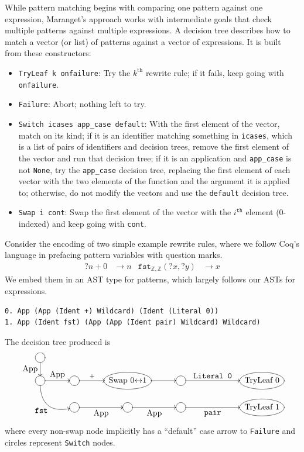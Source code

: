 While pattern matching begins with comparing one pattern against one expression, Maranget's approach works with intermediate goals that check multiple patterns against multiple expressions.
A decision tree describes how to match a vector (or list) of patterns against a vector of expressions.
It is built from these constructors:
\begin{itemize}
  \item \texttt{TryLeaf k onfailure}: Try the $k^\text{th}$ rewrite rule; if it fails, keep going with \texttt{onfailure}.
  \item \texttt{Failure}: Abort; nothing left to try.
  \item \texttt{Switch icases app\_case default}:
    With the first element of the vector, match on its kind; if it is an identifier matching something in \texttt{icases}, which is a list of pairs of identifiers and decision trees, remove the first element of the vector and run that decision tree; if it is an application and \texttt{app\_case} is not \texttt{None}, try the \texttt{app\_case} decision tree, replacing the first element of each vector with the two elements of the function and the argument it is applied to; otherwise, do not modify the vectors and use the \texttt{default} decision tree.
  \item \texttt{Swap i cont}: Swap the first element of the vector with the $i^\texttt{th}$ element (0-indexed) and keep going with \texttt{cont}.
\end{itemize}

Consider the encoding of two simple example rewrite rules, where we follow Coq's \Ltac{} language in prefacing pattern variables with question marks.
\begin{align*}
  ?n + 0 & \to n %
  &
  \texttt{fst}_{\mathbb{Z},\mathbb{Z}}(?x, ?y) & \to x
\end{align*}
We embed them in an AST type for patterns, which largely follows our ASTs for expressions.
\begin{verbatim}
0. App (App (Ident +) Wildcard) (Ident (Literal 0))
1. App (Ident fst) (App (App (Ident pair) Wildcard) Wildcard)
\end{verbatim}
The decision tree produced is \label{sec:compiled-pattern}
\[\xymatrix@C+0.5pc@R-1pc{
  *++[o][F-]\txt{} \ar[d]_{\txt{App}} \\
  *++[o][F-]\txt{} \ar[r]^-{\txt{App}} \ar@/_1.5pc/[dr]_{\txt{\texttt{fst}}} & *++[o][F-]\txt{} \ar[r]^-{+} & *++[o][F-]\txt{Swap 0$\leftrightarrow$1} \ar[r] & *++[o][F-]\txt{} \ar[rr]^-{\txt{\texttt{Literal~0}}} && *++[o][F-]\txt{TryLeaf 0} \\
  & *++[o][F-]\txt{} \ar[r]_-{\txt{App}} & *++[o][F-]\txt{} \ar[r]_-{\txt{App}} & *++[o][F-]\txt{} \ar[rr]_-{\txt{\texttt{pair}}} && *++[o][F-]\txt{TryLeaf 1}
}\]
\noindent where every non-swap node implicitly has a ``default'' case arrow to \texttt{Failure} and circles represent \texttt{Switch} nodes.

